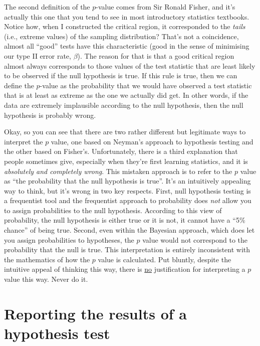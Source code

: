 
The second definition of the $p$-value comes from Sir Ronald Fisher, and it's actually this one that you tend to see in most introductory statistics textbooks. Notice how, when I constructed the critical region, it corresponded to the {\it tails} (i.e., extreme values) of the sampling distribution? That's not a coincidence, almost all ``good'' tests have this characteristic (good in the sense of minimising our type II error rate, $\beta$). The reason for that is that a good critical region almost always corresponds to those values of the test statistic that are least likely to be observed if the null hypothesis is true. If this rule is true, then we can define the $p$-value as the probability that we would have observed a test statistic that is at least as extreme as the one we actually did get. In other words, if the data are extremely implausible according to the null hypothesis, then the null hypothesis is probably wrong.



Okay, so you can see that there are two rather different but legitimate ways to interpret the $p$ value, one based on Neyman's approach to hypothesis testing and the other based on Fisher's. Unfortunately, there is a third explanation that people sometimes give, especially when they're first learning statistics, and it is {\it absolutely and completely wrong}. This mistaken approach is to refer to the $p$ value as ``the probability that the null hypothesis is true''. It's an intuitively appealing way to think, but it's wrong in two key respects. First, null hypothesis testing is a frequentist tool and the frequentist approach to probability does {\it not} allow you to assign probabilities to the null hypothesis. According to this view of probability, the null hypothesis is either true or it is not, it cannot have a ``5\% chance'' of being true. Second, even within the Bayesian approach, which does let you assign probabilities to hypotheses, the $p$ value would not correspond to the probability that the null is true. This interpretation is entirely inconsistent with the mathematics of how the $p$ value is calculated. Put bluntly, despite the intuitive appeal of thinking this way, there is \underline{no} justification for interpreting a $p$ value this way. Never do it.


\section{Reporting the results of a hypothesis test~\label{sec:writeup}}

